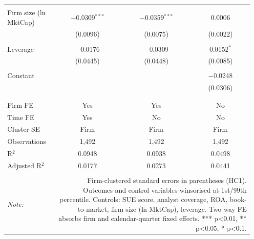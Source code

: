 \begin{table}[!htbp]
\begin{tabular}{@{\extracolsep{5pt}}lccc}
  & & & \\ 
 Firm size (ln MktCap) & $-$0.0309$^{***}$ & $-$0.0359$^{***}$ & 0.0006 \\ 
  & (0.0096) & (0.0075) & (0.0022) \\ 
  & & & \\ 
 Leverage & $-$0.0176 & $-$0.0309 & 0.0152$^{*}$ \\ 
  & (0.0445) & (0.0448) & (0.0085) \\ 
  & & & \\ 
 Constant &  &  & $-$0.0248 \\ 
  &  &  & (0.0306) \\ 
  & & & \\ 
\hline \\[-1.8ex] 
Firm FE & Yes & Yes & No \\ 
Time FE & Yes & No & No \\ 
Cluster SE & Firm & Firm & Firm \\ 
Observations & 1,492 & 1,492 & 1,492 \\ 
R$^{2}$ & 0.0948 & 0.0938 & 0.0498 \\ 
Adjusted R$^{2}$ & 0.0177 & 0.0273 & 0.0441 \\ 
\hline 
\hline \\[-1.8ex] 
\textit{Note:}  & \multicolumn{3}{r}{Firm-clustered standard errors in parentheses (HC1). Outcomes and control variables winsorised at 1st/99th percentile. Controls: SUE score, analyst coverage, ROA, book-to-market, firm size (ln MktCap), leverage. Two-way FE absorbs firm and calendar-quarter fixed effects. *** p<0.01, ** p<0.05, * p<0.1.} \\ 
\end{tabular} 
\end{table} 
